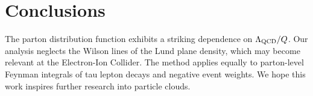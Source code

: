 \section{Conclusions}\label{sec:conclusions}

The parton distribution function exhibits a striking dependence on
$\Lambda_{\rm QCD}/Q$. Our analysis neglects the Wilson lines of the
Lund plane density, which may become relevant at the Electron-Ion
Collider. The method applies equally to parton-level Feynman integrals
of tau lepton decays and negative event weights. We hope this work
inspires further research into particle clouds.

